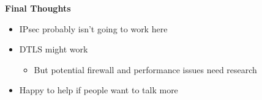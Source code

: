 \documentclass[helvetica]{seminar}
\newcommand{\heading}[1]{%
  \begin{center} 
    \large\bf 
    #1 
  \end{center} 
  \vspace{.4 in}}
\begin{document}
\begin{slide}
\heading{Final Thoughts}

\begin{itemize}
\item IPsec probably isn't going to work here
\item DTLS might work
  \begin{itemize}
  \item But potential firewall and performance issues need research
  \end{itemize}

\item Happy to help if people want to talk more
\end{itemize}

\end{slide}
\end{document}
